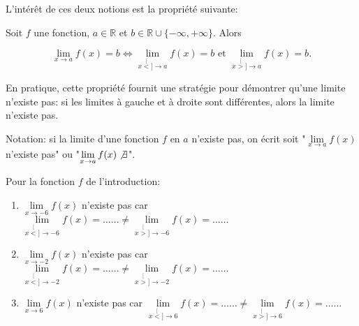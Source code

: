 \documentclass[a4paper,12pt]{report}
\newcommand{\IR}{\mathbb{R}}
\newcommand{\tog}{\stackrel[<]{}{\to}}
\newcommand{\tod}{\stackrel[>]{}{\to}}
\begin{document}
L'intérêt de ces deux notions est la propriété suivante:

\begin{propriete}
Soit \(f\) une fonction, \(a\in\IR\) et
\(b\in\IR\cup\{-\infty,+\infty\}\). Alors

\[
\lim\limits_{x\to a}f(x)=b \Leftrightarrow \lim\limits_{x\tog a}f(x)=b \text{ et } \lim\limits_{x\tod a}f(x)=b.
\]
\end{propriete}

\begin{remarque}
 En pratique, cette propriété fournit une stratégie pour démontrer
qu'une limite n'existe pas: si les limites à gauche et à droite sont
différentes, alors la limite n'existe pas.

Notation: si la limite d'une fonction \(f\) en \(a\) n'existe pas, on
écrit soit "\(\lim\limits_{x\to a}f(x)\) n'existe pas" ou
"\(\lim\limits_{x\to a}f(x)\not\exists\)".
\end{remarque}


\begin{exemple}
Pour la fonction \(f\) de l'introduction:
\begin{enumerate}
\item \(\lim\limits_{x\to -6}f(x)\) n'existe pas car \(\lim\limits_{x\tog -6}f(x)=\ldots\ldots\neq \lim\limits_{x\tod -6}f(x)=\ldots\ldots\)
\item \(\lim\limits_{x\to -2}f(x)\) n'existe pas car \(\lim\limits_{x\tog -2}f(x)=\ldots\ldots\neq \lim\limits_{x\tod -2}f(x)=\ldots\ldots\)
\item \(\lim\limits_{x\to 6}f(x)\) n'existe pas car \(\lim\limits_{x\tog 6}f(x)=\ldots\ldots\neq \lim\limits_{x\tod 6}f(x)=\ldots\ldots\)
\end{enumerate}
\end{exemple}
\end{document}
